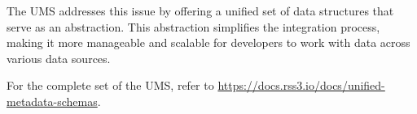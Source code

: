 The \gls{UMS} addresses this issue by offering a unified set of data structures that serve as an abstraction. This abstraction simplifies the integration process, making it more manageable and scalable for developers to work with data across various data sources.

For the complete set of the \gls{UMS}, refer to \url{https://docs.rss3.io/docs/unified-metadata-schemas}.
